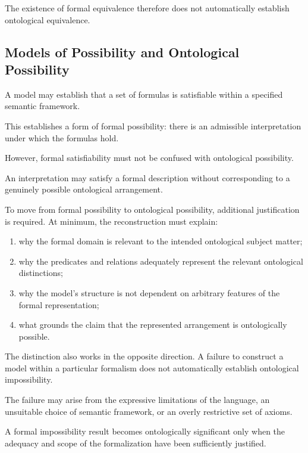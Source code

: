 The existence of formal equivalence therefore does
not automatically establish ontological equivalence.

\subsection{Models of Possibility and Ontological Possibility}

A model may establish that a set of formulas is
satisfiable within a specified semantic framework.

This establishes a form of formal possibility:
there is an admissible interpretation under which
the formulas hold.

However, formal satisfiability must not be confused
with ontological possibility.

An interpretation may satisfy a formal description
without corresponding to a genuinely possible
ontological arrangement.

To move from formal possibility to ontological
possibility, additional justification is required.
At minimum, the reconstruction must explain:

\begin{enumerate}
    \item why the formal domain is relevant to the
    intended ontological subject matter;

    \item why the predicates and relations adequately
    represent the relevant ontological distinctions;

    \item why the model's structure is not dependent
    on arbitrary features of the formal representation;

    \item what grounds the claim that the represented
    arrangement is ontologically possible.
\end{enumerate}

The distinction also works in the opposite direction.
A failure to construct a model within a particular
formalism does not automatically establish ontological
impossibility.

The failure may arise from the expressive limitations
of the language, an unsuitable choice of semantic
framework, or an overly restrictive set of axioms.

A formal impossibility result becomes ontologically
significant only when the adequacy and scope of the
formalization have been sufficiently justified.

